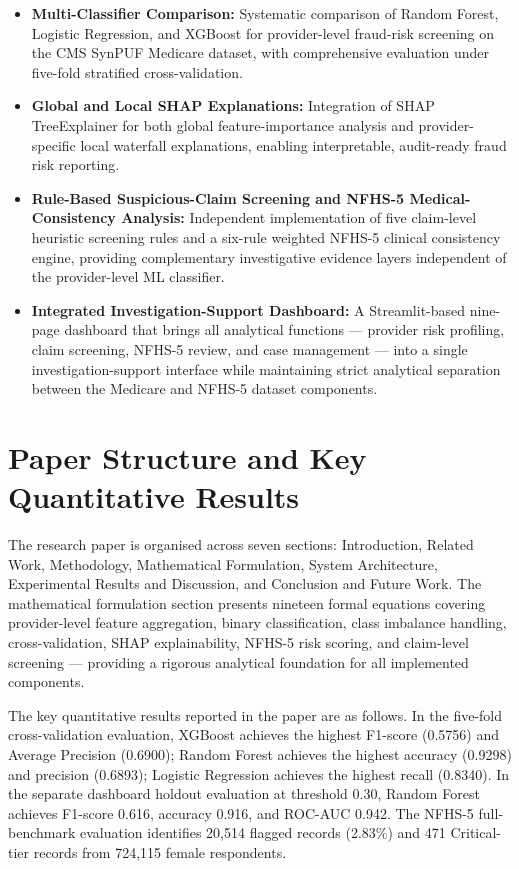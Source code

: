 \begin{itemize}
    \item \textbf{Multi-Classifier Comparison:} Systematic comparison of Random Forest, Logistic Regression, and XGBoost for provider-level fraud-risk screening on the CMS SynPUF Medicare dataset, with comprehensive evaluation under five-fold stratified cross-validation.

    \item \textbf{Global and Local SHAP Explanations:} Integration of SHAP TreeExplainer for both global feature-importance analysis and provider-specific local waterfall explanations, enabling interpretable, audit-ready fraud risk reporting.

    \item \textbf{Rule-Based Suspicious-Claim Screening and NFHS-5 Medical-Consistency Analysis:} Independent implementation of five claim-level heuristic screening rules and a six-rule weighted NFHS-5 clinical consistency engine, providing complementary investigative evidence layers independent of the provider-level ML classifier.

    \item \textbf{Integrated Investigation-Support Dashboard:} A Streamlit-based nine-page dashboard that brings all analytical functions --- provider risk profiling, claim screening, NFHS-5 review, and case management --- into a single investigation-support interface while maintaining strict analytical separation between the Medicare and NFHS-5 dataset components.
\end{itemize}

\section{Paper Structure and Key Quantitative Results}

The research paper is organised across seven sections: Introduction, Related Work, Methodology, Mathematical Formulation, System Architecture, Experimental Results and Discussion, and Conclusion and Future Work. The mathematical formulation section presents nineteen formal equations covering provider-level feature aggregation, binary classification, class imbalance handling, cross-validation, SHAP explainability, NFHS-5 risk scoring, and claim-level screening --- providing a rigorous analytical foundation for all implemented components.

The key quantitative results reported in the paper are as follows. In the five-fold cross-validation evaluation, XGBoost achieves the highest F1-score (0.5756) and Average Precision (0.6900); Random Forest achieves the highest accuracy (0.9298) and precision (0.6893); Logistic Regression achieves the highest recall (0.8340). In the separate dashboard holdout evaluation at threshold 0.30, Random Forest achieves F1-score 0.616, accuracy 0.916, and ROC-AUC 0.942. The NFHS-5 full-benchmark evaluation identifies 20,514 flagged records (2.83\%) and 471 Critical-tier records from 724,115 female respondents.

